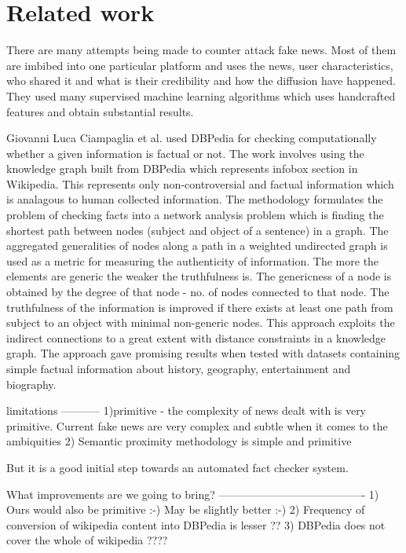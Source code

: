 \documentclass[a4paper, 11pt]{article}
\begin{document}
\section{Related work}

There are many attempts being made to counter attack fake news. Most of them are imbibed into one particular platform and uses the news, user characteristics, who shared it and what is their credibility and how the diffusion have happened. They used many supervised machine learning algorithms which uses handcrafted features and obtain substantial results. 

Giovanni Luca Ciampaglia et al. used DBPedia for checking computationally whether a given information is factual or not. The work involves using the knowledge graph built from DBPedia which represents infobox section in Wikipedia. This represents only non-controversial and factual information which is analagous to human collected information. The methodology formulates the problem of checking facts into a network analysis problem which is finding the shortest path between nodes (subject and object of a sentence) in a graph. The aggregated generalities of nodes along a path in a weighted undirected graph is used as a metric for measuring the authenticity of information. The more the elements are generic the weaker the truthfulness is.  The genericness of a node is obtained by the degree of that node - no. of nodes connected to that node. The truthfulness of the information is improved if there exists at least one path from subject to an object with minimal non-generic nodes. This approach exploits the indirect connections to a great extent with distance constraints in a knowledge graph. The approach gave promising results when tested with datasets containing simple factual information about history, geography, entertainment and biography. 

limitations
-----------
1)primitive - the complexity of news dealt with is very primitive. Current fake news are very complex and subtle when it comes to the ambiquities
2) Semantic proximity methodology is simple and primitive


But it is a good initial step towards an automated fact checker system.


What improvements are we going to bring?
----------------------------------------
1) Ours would also be primitive :-) May be slightly better :-)
2) Frequency of conversion of wikipedia content into DBPedia is lesser ??
3) DBPedia does not cover the whole of wikipedia ???? 
\end{document}
